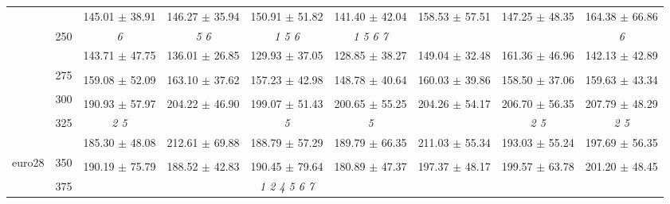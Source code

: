 \begin{table}[h]
{\begin{tabular}{
        ccccccccc}
 & & \cellcolor[HTML]{EFEFEF} 145.01 $\pm$ 38.91& \cellcolor[HTML]{EFEFEF} 146.27 $\pm$ 35.94& \cellcolor[HTML]{EFEFEF} 150.91 $\pm$ 51.82& \cellcolor[HTML]{EFEFEF} 141.40 $\pm$ 42.04& \cellcolor[HTML]{EFEFEF} 158.53 $\pm$ 57.51& \cellcolor[HTML]{EFEFEF} 147.25 $\pm$ 48.35& \cellcolor[HTML]{EFEFEF} 164.38 $\pm$ 66.86 \\ 
 & \multirow{2}{*}{250}& \textit{ 6 }& \textit{ 5 6 }& \textit{ 1 5 6 }& \textit{ 1 5 6 7 }& & & \textit{ 6 } \\ 
 & & 143.71 $\pm$ 47.75& 136.01 $\pm$ 26.85& 129.93 $\pm$ 37.05& 128.85 $\pm$ 38.27& 149.04 $\pm$ 32.48& 161.36 $\pm$ 46.96& 142.13 $\pm$ 42.89 \\ 
 & \multirow{2}{*}{275}& \cellcolor[HTML]{EFEFEF} & \cellcolor[HTML]{EFEFEF} & \cellcolor[HTML]{EFEFEF} & \cellcolor[HTML]{EFEFEF} & \cellcolor[HTML]{EFEFEF} & \cellcolor[HTML]{EFEFEF} & \cellcolor[HTML]{EFEFEF}  \\ 
 & & \cellcolor[HTML]{EFEFEF} 159.08 $\pm$ 52.09& \cellcolor[HTML]{EFEFEF} 163.10 $\pm$ 37.62& \cellcolor[HTML]{EFEFEF} 157.23 $\pm$ 42.98& \cellcolor[HTML]{EFEFEF} 148.78 $\pm$ 40.64& \cellcolor[HTML]{EFEFEF} 160.03 $\pm$ 39.86& \cellcolor[HTML]{EFEFEF} 158.50 $\pm$ 37.06& \cellcolor[HTML]{EFEFEF} 159.63 $\pm$ 43.34 \\ 
 & \multirow{2}{*}{300}& & & & & & &  \\ 
 & & 190.93 $\pm$ 57.97& 204.22 $\pm$ 46.90& 199.07 $\pm$ 51.43& 200.65 $\pm$ 55.25& 204.26 $\pm$ 54.17& 206.70 $\pm$ 56.35& 207.79 $\pm$ 48.29 \\ 
 & \multirow{2}{*}{325}& \cellcolor[HTML]{EFEFEF} \textit{ 2 5 }& \cellcolor[HTML]{EFEFEF} & \cellcolor[HTML]{EFEFEF} \textit{ 5 }& \cellcolor[HTML]{EFEFEF} \textit{ 5 }& \cellcolor[HTML]{EFEFEF} & \cellcolor[HTML]{EFEFEF} \textit{ 2 5 }& \cellcolor[HTML]{EFEFEF} \textit{ 2 5 } \\ 
 & & \cellcolor[HTML]{EFEFEF} 185.30 $\pm$ 48.08& \cellcolor[HTML]{EFEFEF} 212.61 $\pm$ 69.88& \cellcolor[HTML]{EFEFEF} 188.79 $\pm$ 57.29& \cellcolor[HTML]{EFEFEF} 189.79 $\pm$ 66.35& \cellcolor[HTML]{EFEFEF} 211.03 $\pm$ 55.34& \cellcolor[HTML]{EFEFEF} 193.03 $\pm$ 55.24& \cellcolor[HTML]{EFEFEF} 197.69 $\pm$ 56.35 \\ 
 \multirow{4}{*}{euro28} & \multirow{2}{*}{350}& & & & & & &  \\ 
 & & 190.19 $\pm$ 75.79& 188.52 $\pm$ 42.83& 190.45 $\pm$ 79.64& 180.89 $\pm$ 47.37& 197.37 $\pm$ 48.17& 199.57 $\pm$ 63.78& 201.20 $\pm$ 48.45 \\ 
 & \multirow{2}{*}{375}& \cellcolor[HTML]{EFEFEF} & \cellcolor[HTML]{EFEFEF} & \cellcolor[HTML]{EFEFEF} \textit{ 1 2 4 5 6 7 }& \cellcolor[HTML]{EFEFEF} & \cellcolor[HTML]{EFEFEF} & \cellcolor[HTML]{EFEFEF} & \cellcolor[HTML]{EFEFEF}  \\ 

\end{tabular}}
\end{table}
